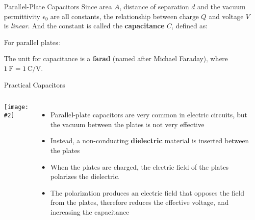 \documentclass[12pt,aspectratio=169]{beamer}
\newcommand{\pic}[2]{\texttt{[image: \#2]}}
\newcommand{\eq}[2]{\vspace{#1}{\Large\begin{displaymath}#2\end{displaymath}}}
\begin{document}
\begin{frame}{Parallel-Plate Capacitors}
  Since area $A$, distance of separation $d$ and the vacuum permittivity
  $\epsilon_0$ are all constants, the relationship between charge $Q$ and
  voltage $V$ is \emph{linear}. And the constant is called the
  \textbf{capacitance} $C$, defined as:

  \eq{-.15in}{
    \boxed{C=\frac{Q}{V}}
  }

  For parallel plates:

  \eq{-.2in}{
    C=\frac{A\epsilon_0}{d}
  }

  The unit for capacitance is a \textbf{farad} (named after Michael Faraday),
  where $\SI{1}{\farad}=\SI{1}{\coulomb\per\volt}$.
\end{frame}


%  
%  



\begin{frame}{Practical Capacitors}
  \begin{columns}
    \pic{1.15}{Figure_20_05_05a.png}
    \begin{itemize}
    \item Parallel-plate capacitors are very common in electric circuits,
      but the vacuum between the plates is not very effective
    \item Instead, a non-conducting \textbf{dielectric} material is inserted
      between the plates
    \item When the plates are charged, the electric field of the plates
      polarizes the dielectric.
    \item The polarization  produces an electric field that opposes the field
      from the plates, therefore reduces the effective voltage, and increasing
      the capacitance
    \end{itemize}
  \end{columns}
\end{frame}
\end{document}
